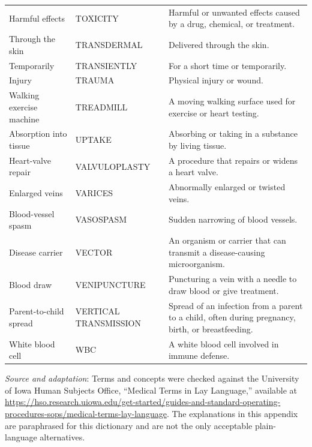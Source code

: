 \begin{longtable}{>{\raggedright\arraybackslash}p{} >{\raggedright\arraybackslash}p{} >{\raggedright\arraybackslash}p{}}
Harmful effects & TOXICITY & Harmful or unwanted effects caused by a drug, chemical, or treatment. \\
Through the skin & TRANSDERMAL & Delivered through the skin. \\
Temporarily & TRANSIENTLY & For a short time or temporarily. \\
Injury & TRAUMA & Physical injury or wound. \\
Walking exercise machine & TREADMILL & A moving walking surface used for exercise or heart testing. \\
Absorption into tissue & UPTAKE & Absorbing or taking in a substance by living tissue. \\
Heart-valve repair & VALVULOPLASTY & A procedure that repairs or widens a heart valve. \\
Enlarged veins & VARICES & Abnormally enlarged or twisted veins. \\
Blood-vessel spasm & VASOSPASM & Sudden narrowing of blood vessels. \\
Disease carrier & VECTOR & An organism or carrier that can transmit a disease-causing microorganism. \\
Blood draw & VENIPUNCTURE & Puncturing a vein with a needle to draw blood or give treatment. \\
Parent-to-child spread & VERTICAL TRANSMISSION & Spread of an infection from a parent to a child, often during pregnancy, birth, or breastfeeding. \\
White blood cell & WBC & A white blood cell involved in immune defense. \\

\end{longtable}

\medskip
\noindent\textit{Source and adaptation}: Terms and concepts were checked against the University of Iowa Human Subjects Office, ``Medical Terms in Lay Language,'' available at \url{https://hso.research.uiowa.edu/get-started/guides-and-standard-operating-procedures-sops/medical-terms-lay-language}. The explanations in this appendix are paraphrased for this dictionary and are not the only acceptable plain-language alternatives.
